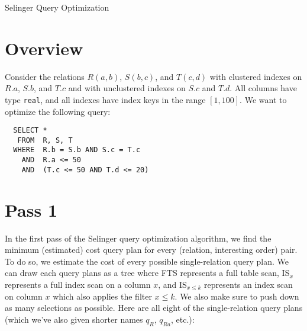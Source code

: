 \documentclass{article}
\begin{document}
\begin{center}
  \huge Selinger Query Optimization
\end{center}

\section*{Overview}
Consider the relations $R(a, b)$, $S(b, c)$, and $T(c, d)$ with clustered
indexes on $R.a$, $S.b$, and $T.c$ and with unclustered indexes on $S.c$ and
$T.d$. All columns have type \texttt{real}, and all indexes have index keys in
the range $[1, 100]$. We want to optimize the following query:
\begin{verbatim}
  SELECT *
   FROM  R, S, T
  WHERE  R.b = S.b AND S.c = T.c
    AND  R.a <= 50
    AND  (T.c <= 50 AND T.d <= 20)
\end{verbatim}

\section*{Pass 1}
\newcommand{\fts}{FTS}
\newcommand{\is}[1]{IS$_{#1}$}
\newcommand{\select}[1]{$\sigma_{#1}$}

In the first pass of the Selinger query optimization algorithm, we find the
minimum (estimated) cost query plan for every (relation, interesting order)
pair. To do so, we estimate the cost of every possible single-relation query
plan. We can draw each query plans as a tree where \fts{} represents a full
table scan, \is{x} represents a full index scan on a column $x$, and \is{x \leq
k} represents an index scan on column $x$ which also applies the filter $x \leq
k$. We also make sure to push down as many selections as possible. Here are all
eight of the single-relation query plans (which we've also given shorter names
$q_R$, $q_{Ra}$, etc.):

\newcommand{\plan}[1]{\tikz[yscale=0.5]{#1}}

\newcommand{\rfts}{\plan{
  \node{\select{R.a \leq 50}} child {node{\fts} child {node {$R$}}};
}}
\newcommand{\risa}{\plan{ \node{\is{a \leq 50}} child {node{$R$}}; }}
\newcommand{\sfts}{\plan{ \node{\fts} child {node{$S$}}; }}
\newcommand{\sisb}{\plan{ \node{\is{b}} child {node{$S$}}; }}
\newcommand{\sisc}{\plan{ \node{\is{c}} child {node{$S$}}; }}
\newcommand{\tfts}{\plan{
  \node{\select{T.d \leq 20}}
    child { node{\select{T.c \leq 50}}
      child {node{\fts} child {node {$R$}}}
    };
}}
\newcommand{\tisc}{\plan{
  \node{\select{R.d \leq 20}} child {node{\is{c \leq 50}} child {node {$R$}}};
}}
\newcommand{\tisd}{\plan{
  \node{\select{R.c \leq 50}} child {node{\is{d \leq 20}} child {node {$R$}}};
}}
\end{document}
